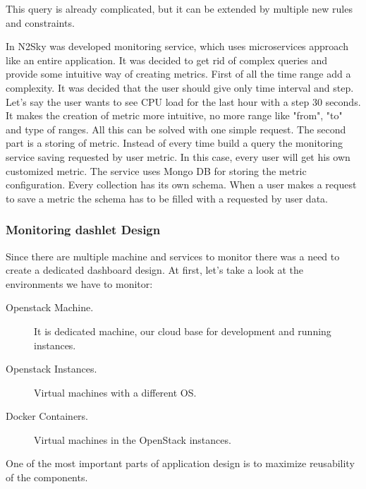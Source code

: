 This query is already complicated, but it can be extended by multiple new rules and constraints. 

In N2Sky was developed monitoring service, which uses microservices approach like an entire application. It was decided to get rid of complex queries and provide some intuitive way of creating metrics. 
First of all the time range add a complexity. It was decided that the user should give only time interval and step. Let's say the user wants to see CPU load for the last hour with a step 30 seconds. It makes the creation of metric more intuitive, no more range like "from", "to" and type of ranges. All this can be solved with one simple request. 
The second part is a storing of metric. Instead of every time build a query the monitoring service saving requested by user metric. In this case, every user will get his own customized metric. 
The service uses Mongo DB for storing the metric configuration. Every collection has its own schema. When a user makes a request to save a metric the schema has to be filled with a requested by user data.

\subsubsection{Monitoring dashlet Design}\label{Monitoring dashlet Design}

Since there are multiple machine and services to monitor there was a need to create a dedicated dashboard design.  At first, let's take a look at the environments we have to monitor: 
\begin{description}
\item[Openstack Machine.]  It is dedicated machine, our cloud base for development and running instances.
\item[Openstack Instances.]   Virtual machines with a different OS.
\item[Docker Containers.]  Virtual machines in the OpenStack instances.
\end{description}

One of the most important parts of application design is to maximize reusability of the components. 


